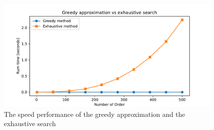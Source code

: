 \documentclass[a4paper]{article}
\begin{document}
\begin{figure}
    \includegraphics[width=\textwidth]{./comparison.pdf}
    \caption{The speed performance of the greedy approximation and the exhaustive search}
\end{figure}
\end{document}
